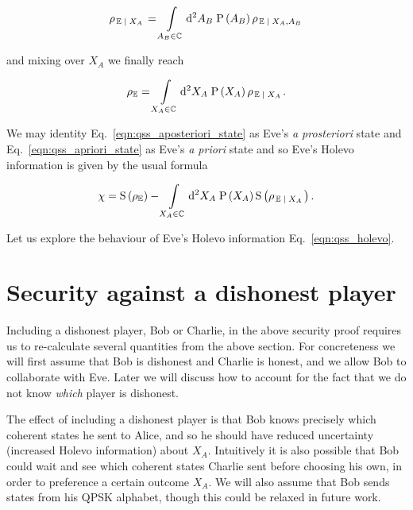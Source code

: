 \begin{equation}\label{eqn:qss_aposteriori_state}
\rho_{\left.\mathbb{E} \; \middle| \; X_A\right.} = \int\limits_{A_B \in \mathbb{C}} \mathop{}\!\mathrm{d^2} A_B \; \text{P}\left(A_B\right) \rho_{\left.\mathbb{E} \; \middle| \; X_A, A_B\right.}
\end{equation}

\noindent and mixing over $X_A$ we finally reach

\begin{equation}\label{eqn:qss_apriori_state}
\rho_{\mathbb{E}} = \int\limits_{X_A \in \mathbb{C}} \mathop{}\!\mathrm{d^2} X_A \; \text{P}\left(X_A\right) \rho_{\left.\mathbb{E}\; \middle| \; X_A\right.}.
\end{equation}

\noindent We may identity Eq.~\ref{eqn:qss_aposteriori_state} as Eve's \emph{a prosteriori} state and Eq.~\ref{eqn:qss_apriori_state} as Eve's \emph{a priori} state and so Eve's Holevo information is given by the usual formula

\begin{equation}\label{eqn:qss_holevo}
\chi = \text{S}\left(\rho_\mathbb{E}\right) - \int\limits_{X_A \in \mathbb{C}} \mathop{}\!\mathrm{d^2} X_A \; \text{P}\left(X_A\right) \text{S}\left(\rho_{\left.\mathbb{E} \; \middle| \; X_A\right.}\right).
\end{equation}

\noindent Let us explore the behaviour of Eve's Holevo information Eq.~\ref{eqn:qss_holevo}.


\section{Security against a dishonest player}
Including a dishonest player, Bob or Charlie, in the above security proof requires us to re-calculate several quantities from the above section. For concreteness we will first assume that Bob is dishonest and Charlie is honest, and we allow Bob to collaborate with Eve. Later we will discuss how to account for the fact that we do not know \emph{which} player is dishonest.

The effect of including a dishonest player is that Bob knows precisely which coherent states he sent to Alice, and so he should have reduced uncertainty (increased Holevo information) about $X_A$. Intuitively it is also possible that Bob could wait and see which coherent states Charlie sent before choosing his own, in order to preference a certain outcome $X_A$.  We will also assume that Bob sends states from his QPSK alphabet, though this could be relaxed in future work.

